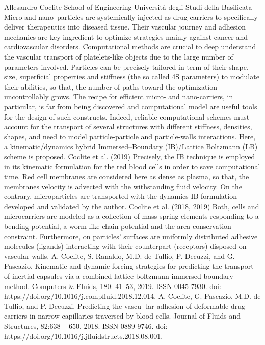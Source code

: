 \documentclass{article}
\begin{document}
{Allesandro Coclite}
{School of Engineering Università degli Studi della Basilicata}
{Micro and nano–particles are systemically injected as drug carriers to specifically
deliver therapeutics into diseased tissue. Their vascular journey and adhesion mechanics
are key ingredient to optimize strategies mainly against cancer and cardiovascular
disorders. Computational methods are crucial to deep understand the vascular transport of
platelets-like objects due to the large number of parameters involved. Particles can be
precisely tailored in term of their shape, size, superficial properties and stiffness
(the so called 4S parameters) to modulate their abilities, so that, the number of paths
toward the optimization uncontrollably grows. The recipe for efficient micro- and
nano-carriers, in particular, is far from being discovered and computational model are
useful tools for the design of such constructs. Indeed, reliable computational schemes
must account for the transport of several structures with different stiffness, densities,
shapes, and need to model particle-particle and particle-walls interactions.  Here, a
kinematic/dynamics hybrid Immersed–Boundary (IB)/Lattice Boltzmann (LB) scheme is
proposed. Coclite et al. (2019) Precisely, the IB technique is employed in its kinematic
formulation for the red blood cells in order to save computational time. Red cell
membranes are considered here as dense as plasma, so that, the membranes velocity is
advected with the withstanding fluid velocity. On the contrary, microparticles are
transported with the dynamics IB formulation developed and validated by the author.
Coclite et al. (2018, 2019) Both, cells and microcarriers are modeled as a collection of
mass-spring elements responding to a bending potential, a worm-like chain potential and
the area conservation constraint. Furthermore, on particles’ surfaces are uniformly
distributed adhesive molecules (ligands) interacting with their counterpart (receptors)
disposed on vascular walls.\newline\newline
\small{A. Coclite, S. Ranaldo, M.D. de Tullio, P. Decuzzi, and G. Pascazio. Kinematic
and dynamic forcing strategies for predicting the transport of inertial capsules via a
combined lattice boltzmann immersed boundary method. Computers \& Fluids, 180:
41–53, 2019. ISSN 0045-7930. doi: https://doi.org/10.1016/j.compfluid.2018.12.014.\newline
A. Coclite, G. Pascazio, M.D. de Tullio, and P. Decuzzi. Predicting the vascu-
lar adhesion of deformable drug carriers in narrow capillaries traversed by blood
cells. Journal of Fluids and Structures, 82:638 – 650, 2018. ISSN 0889-9746. doi:
https://doi.org/10.1016/j.jfluidstructs.2018.08.001.}}
\end{document}
